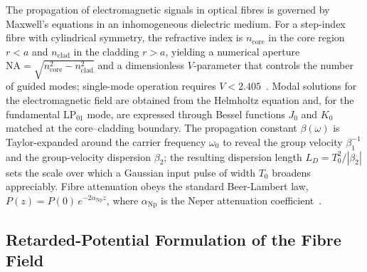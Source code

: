 \documentclass[journal,twocolumn]{IEEEtran}
\theoremstyle{definition}
\theoremstyle{plain}
\begin{document}
The propagation of electromagnetic signals in optical fibres is
governed by Maxwell's equations in an inhomogeneous dielectric
medium.  For a step-index fibre with cylindrical symmetry, the
refractive index is $n_{\mathrm{core}}$ in the core region $r < a$
and $n_{\mathrm{clad}}$ in the cladding $r > a$, yielding a
numerical aperture $\mathrm{NA}=\sqrt{n_{\mathrm{core}}^2 -
n_{\mathrm{clad}}^2}$ and a dimensionless $V$-parameter that
controls the number of guided modes; single-mode operation requires
$V < 2.405$~\cite{snyder1983}.  Modal solutions for the
electromagnetic field are obtained from the Helmholtz equation and,
for the fundamental $\mathrm{LP}_{01}$ mode, are expressed through
Bessel functions $J_0$ and $K_0$ matched at the core--cladding
boundary.  The propagation constant $\beta(\omega)$ is Taylor-expanded
around the carrier frequency $\omega_0$ to reveal the group velocity
$\beta_1^{-1}$ and the group-velocity dispersion $\beta_2$; the
resulting dispersion length $L_D = T_0^2/|\beta_2|$ sets the scale
over which a Gaussian input pulse of width $T_0$ broadens
appreciably.  Fibre attenuation obeys the standard Beer-Lambert law,
$P(z) = P(0)\,e^{-2\alpha_{\mathrm{Np}}z}$, where $\alpha_{\mathrm{Np}}$
is the Neper attenuation coefficient~\cite{agrawal2007}.

\subsection{Retarded-Potential Formulation of the Fibre Field}
\label{subsec:retarded}
\end{document}

